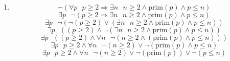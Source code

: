 \documentclass[a4paper]{article}
\begin{document}
\begin{enumerate}
		\item
		\begin{equation*}
			\lnot (\forall p \text{ } p \geq 2 \Rightarrow \exists n \text{ } n \geq 2 \land \text{prim}(p) \land p \leq n)
		\end{equation*}
		\begin{equation*}
			\exists p \text{ } \lnot(p \geq 2 \Rightarrow \exists n \text{ } n \geq 2 \land \text{prim}(p) \land p \leq n)
		\end{equation*}
		\begin{equation*}
			\exists p \text{ } \lnot(\lnot (p \geq 2) \lor (\exists n \text{ } n \geq 2 \land \text{prim}(p) \land p \leq n))
		\end{equation*}
		\begin{equation*}
			\exists p \text{ } ((p \geq 2) \land \lnot (\exists n \text{ } n \geq 2 \land \text{prim}(p) \land p \leq n))
		\end{equation*}
		\begin{equation*}
			\exists p \text{ } ((p \geq 2) \land \forall n \text{ } \lnot (n \geq 2 \land (\text{prim}(p) \land p \leq n)))
		\end{equation*}
		\begin{equation*}
			\exists p \text{ } p \geq 2 \land \forall n \text{ } \lnot (n \geq 2) \lor \lnot (\text{prim}(p) \land p \leq n)
		\end{equation*}
		\begin{equation*}
			\exists p \text{ } p \geq 2 \land \forall n \text{ } \lnot (n \geq 2) \lor \lnot (\text{prim}(p)) \lor \lnot (p \leq n)
		\end{equation*}
	\end{enumerate}
\end{document}
